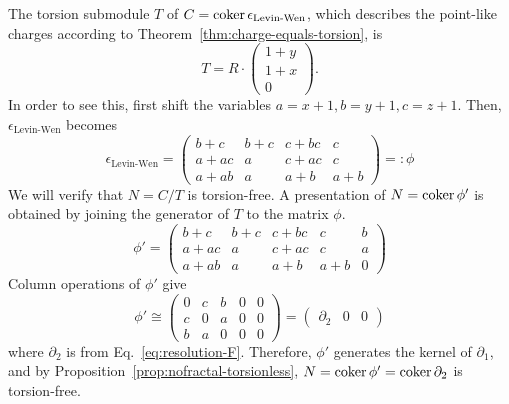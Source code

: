 \begin{example}
The torsion submodule $T$ of $C = \mathop{\mathrm{coker}}\nolimits \epsilon_\text{Levin-Wen}$,
which describes the point-like charges according to Theorem~\ref{thm:charge-equals-torsion},
is
\begin{equation}
 T = R \cdot \begin{pmatrix} 1+y \\ 1+x \\ 0 \end{pmatrix} .
\label{eq:Levin-Wen-torsion}
\end{equation}
In order to see this, first shift the variables $a = x+1, b=y+1, c=z+1$.
Then, $\epsilon_\text{Levin-Wen}$ becomes
\[
\epsilon_\text{Levin-Wen} =
\begin{pmatrix}
 b+c & b+c & c+b c & c \\
 a+a c & a & c+a c & c \\
 a+a b & a & a+b & a+b
\end{pmatrix}
 =: \phi
\]
We will verify that $N = C / T$ is torsion-free.
A presentation of $N = \mathop{\mathrm{coker}}\nolimits \phi'$ is obtained by joining the generator of $T$ to the matrix $\phi$.
\[
 \phi' = 
\begin{pmatrix}
 b+c & b+c & c+b c & c & b \\
 a+a c & a & c+a c & c & a \\
 a+a b & a & a+b & a+b & 0
\end{pmatrix}
\]
Column operations of $\phi'$ give
\[
 \phi' \cong
\begin{pmatrix}
 0 & c & b & 0 & 0 \\
 c & 0 & a & 0 & 0 \\
 b & a & 0 & 0 & 0
\end{pmatrix} = 
\begin{pmatrix}
 \partial_2 & 0 & 0
\end{pmatrix}
\]
where $\partial_2$ is from Eq.~\eqref{eq:resolution-F}.
Therefore, $\phi'$ generates the kernel of $\partial_1$,
and by Proposition~\ref{prop:nofractal-torsionless}, $N = \mathop{\mathrm{coker}}\nolimits \phi'= \mathop{\mathrm{coker}}\nolimits \partial_2$ is torsion-free.


\end{example}

